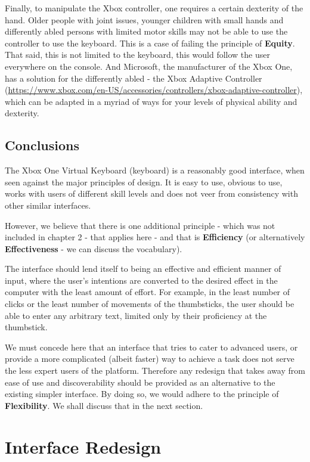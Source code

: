 \documentclass[
	letterpaper, %
]{jdf}
\begin{document}
Finally, to manipulate the Xbox controller, one requires a certain dexterity of the hand. Older people with joint issues, younger children with small hands and differently abled persons with limited motor skills may not be able to use the controller to use the keyboard. This is a case of failing the principle of \textbf{Equity}. That said, this is not limited to the keyboard, this would follow the user everywhere on the console. And Microsoft, the manufacturer of the Xbox One, has a solution for the differently abled - the Xbox Adaptive Controller (\url{https://www.xbox.com/en-US/accessories/controllers/xbox-adaptive-controller}), which can be adapted in a myriad of ways for your levels of physical ability and dexterity.


\subsection{Conclusions}
The Xbox One Virtual Keyboard (keyboard) is a reasonably good interface, when seen against the major principles of design. It is easy to use, obvious to use, works with users of different skill levels and does not veer from consistency with other similar interfaces.

However, we believe that there is one additional principle - which was not included in chapter 2 - that applies here - and that is \textbf{Efficiency} (or alternatively \textbf{Effectiveness} - we can discuss the vocabulary).

The interface should lend itself to being an effective and efficient manner of input, where the user's intentions are converted to the desired effect in the computer with the least amount of effort. For example, in the least number of clicks or the least number of movements of the thumbsticks, the user should be able to enter any arbitrary text, limited only by their proficiency at the thumbstick.

We must concede here that an interface that tries to cater to advanced users, or provide a more complicated (albeit faster) way to achieve a task does not serve the less expert users of the platform. Therefore any redesign that takes away from ease of use and discoverability should be provided as an alternative to the existing simpler interface. By doing so, we would adhere to the principle of \textbf{Flexibility}. We shall discuss that in the next section.


\section{Interface Redesign}
\end{document}
